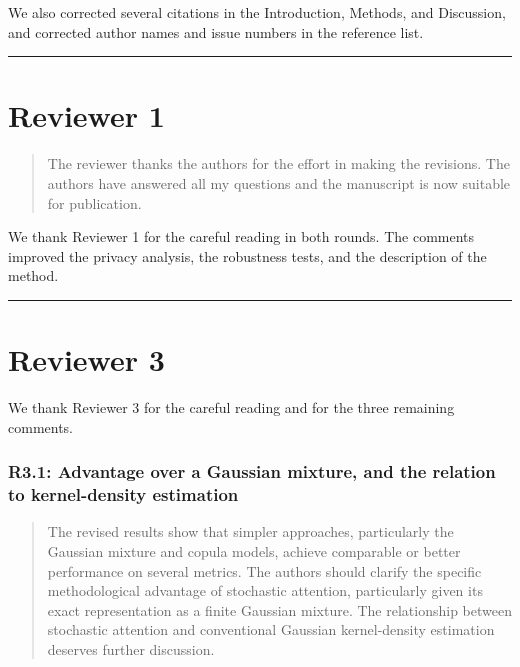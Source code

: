 \documentclass[
  11pt,
  letterpaper,
]{article}
\begin{document}
We also corrected several citations in the Introduction, Methods, and
Discussion, and corrected author names and issue numbers in the
reference list.

\begin{center}\rule{0.5\linewidth}{0.5pt}\end{center}

\section{Reviewer 1}\label{reviewer-1}

\begin{quote}
The reviewer thanks the authors for the effort in making the revisions.
The authors have answered all my questions and the manuscript is now
suitable for publication.
\end{quote}

We thank Reviewer 1 for the careful reading in both rounds. The comments
improved the privacy analysis, the robustness tests, and the description
of the method.

\begin{center}\rule{0.5\linewidth}{0.5pt}\end{center}

\section{Reviewer 3}\label{reviewer-3}

We thank Reviewer 3 for the careful reading and for the three remaining
comments.

\subsubsection{R3.1: Advantage over a Gaussian mixture, and the relation
to kernel-density
estimation}\label{r3.1-advantage-over-a-gaussian-mixture-and-the-relation-to-kernel-density-estimation}

\begin{quote}
The revised results show that simpler approaches, particularly the
Gaussian mixture and copula models, achieve comparable or better
performance on several metrics. The authors should clarify the specific
methodological advantage of stochastic attention, particularly given its
exact representation as a finite Gaussian mixture. The relationship
between stochastic attention and conventional Gaussian kernel-density
estimation deserves further discussion.
\end{quote}
\end{document}
